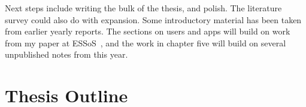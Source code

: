 \documentclass[a4paper]{scrartcl}
\begin{document}

Next steps include writing the bulk of the thesis, and polish.  The literature
survey could also do with expansion.  Some introductory material has been
taken from earlier yearly reports.  The sections on users and apps will build on
work from my paper at ESSoS~\cite{hallett_apppal_2016}, and the work in chapter
five will build on several unpublished notes from this year.




\pagebreak
\appendix
\section{Thesis Outline}
\label{sec:thesis-outline}
\end{document}
